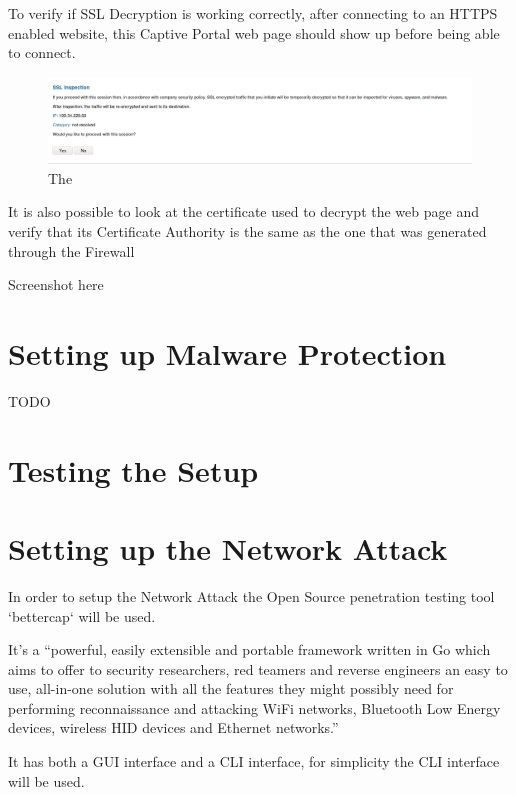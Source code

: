 \documentclass[status=normal,cover=tesi,language=en]{gmeepd}
\begin{document}
\pagebreak

To verify if SSL Decryption is working correctly, after connecting to an HTTPS enabled website, this Captive Portal web page should show up before being able to connect.

\begin{figure}[!h]
\centering
 \includegraphics[width=13cm]{img/ssl_inspection_result.png}
	\caption{The }\label{SSL Inspection Page}
\end{figure}

It is also possible to look at the certificate used to decrypt the web page and verify that its Certificate Authority is the same as the one that was generated through the Firewall

Screenshot here

\pagebreak

\section{Setting up Malware Protection}

TODO

\section{Testing the Setup}

\pagebreak

\section{Setting up the Network Attack}

In order to setup the Network Attack the Open Source penetration testing tool `bettercap` will be used.

It's a ``powerful, easily extensible and portable framework written in Go which aims to offer to security researchers, red teamers and reverse engineers an easy to use, all-in-one solution with all the features they might possibly need for performing reconnaissance and attacking WiFi networks, Bluetooth Low Energy devices, wireless HID devices and Ethernet networks.''\cite{bettercap}

It has both a GUI interface and a CLI interface, for simplicity the CLI interface will be used.
\end{document}
